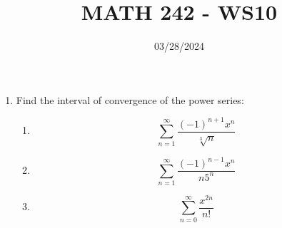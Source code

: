 \documentclass[12pt]{article}
\title{MATH 242 - WS10}
\date{03/28/2024}
\begin{document}
\maketitle


\begin{enumerate}

\item Find the interval of convergence of the power series:
\begin{enumerate}
    \item $$\sum_{n=1}^{\infty}\frac{(-1)^{n+1}x^n}{\sqrt[3]{n}}$$
    \newpage
    \item $$\sum_{n=1}^{\infty}\frac{(-1)^{n-1}x^n}{n5^n}$$
    \vfill
    \item $$\sum_{n=0}^{\infty}\frac{x^{2n}}{n!}$$
    \vfill
\end{enumerate}

\end{enumerate}
\end{document}

